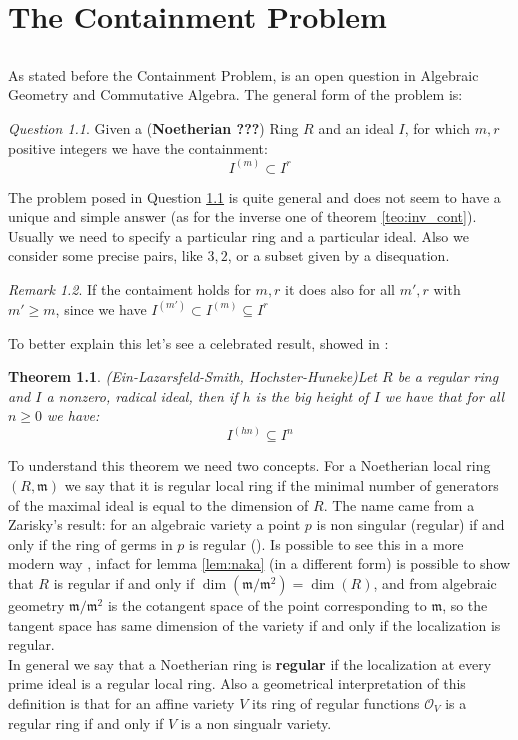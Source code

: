 \documentclass[]{book}
\theoremstyle{plain}
\newtheorem{teo}{Theorem}[section]
\theoremstyle{remark}
\newtheorem{rem}{Remark}
\newtheorem{que}[rem]{Question}
\theoremstyle{definition}
\newcommand{\mm}{\mathfrak{m}}
\newcommand{\cont}[2]{ I^{(#1)} \subseteq I^{#2}}
\begin{document}
\chapter{The Containment Problem}
\section*{}
	As stated before the Containment Problem, is an open question in Algebraic Geometry and Commutative Algebra. The general form of the problem is:
	\begin{que} \label{que:cont}
		Given a (\textbf{Noetherian ???}) Ring $ R $ and an ideal $ I $, for which $ m,r $ positive integers we have the containment:
		$$ I^{(m)} \subset I^r $$
	\end{que}
	The problem posed in Question \ref{que:cont} is quite general and does not seem to have a unique and simple answer (as for the inverse one of theorem \ref{teo:inv_cont}). Usually we need to specify a particular ring and a particular ideal. Also we consider some precise pairs, like $ 3,2 $, or a subset given by a disequation. 
	\begin{rem}
	If the contaiment holds for $ m,r $ it does also for all $ m' ,r $ with $ m'\geq m $, since we have $ I^{(m')} \subset \cont{m}{r} $
	\end{rem}
	To better explain this let's see a celebrated result, showed in \cite{HocHun02,EinLazSmi01}:
	\begin{teo}{(Ein-Lazarsfeld-Smith, Hochster-Huneke)}\label{teo:cont:bigh}
	Let $ R $ be a regular ring and $ I $ a nonzero, radical ideal, then if $ h $ is the big height of $ I $ we have that for all $ n \geq 0 $ we have:
	\[ \cont{hn}{n}\]	
	\end{teo} 
	
	To understand this theorem we need two concepts.
	For a Noetherian local ring $ (R,\mm) $ we say that it is regular local ring if the minimal number of generators of the maximal ideal is equal to the dimension of $ R $. The name came from a Zarisky's result: for an algebraic variety a point $ p $ is non singular (regular) if and only if the ring of germs in $ p $ is regular (\cite{Zar40}). Is possible to see this in a more modern way , infact for lemma \ref{lem:naka} (in a different form) is possible to show that $ R $ is regular if and only if $ \dim(\mm / \mm^2 ) = \dim (R) $, and from algebraic geometry $ \mm /\mm^2 $ is the cotangent space of the point corresponding to $ \mm $, so the tangent space has same dimension of the variety if and only if the localization is regular.\\
	In general we say that a Noetherian ring is \textbf{regular} if the localization at every prime ideal is a regular local ring. Also a geometrical interpretation of this definition is that for an affine variety $ V $ its ring of regular functions $ \mathcal{O}_V $ is a regular ring if and only if $ V $ is a non singualr variety. 
	
\end{document}
